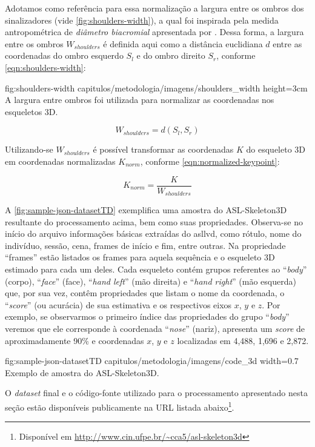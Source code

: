 \begin{enumerate}
          Adotamos como referência para essa normalização a largura entre os ombros dos sinalizadores (vide \autoref{fig:shoulders-width}), a qual foi inspirada pela medida antropométrica de \textit{diâmetro biacromial} apresentada por . Dessa forma, a largura entre os ombros \(W_{shoulders}\) é definida aqui como a distância euclidiana \(d\) entre as coordenadas do ombro esquerdo \(S_{l}\) e do ombro direito \(S_ {r}\), conforme \autoref{eqn:shoulders-width}:

          \figura
          {fig:shoulders-width} %
          {capitulos/metodologia/imagens/shoulders_width} %
          {height=3cm} %
          {A largura entre ombros foi utilizada para normalizar as coordenadas nos esqueletos 3D.} %
          {} %

          \begin{equation}
              \label{eqn:shoulders-width}
              W_{shoulders} = d\left(S_{l}, S_{r}\right)
          \end{equation}

          Utilizando-se \(W_{shoulders}\) é possível transformar as coordenadas \(K\) do esqueleto 3D em coordenadas normalizadas \(K_{norm}\), conforme \autoref{eqn:normalized-keypoint}:

          \begin{equation}
              \label{eqn:normalized-keypoint}
              K_{norm} = \frac{K}{W_{shoulders}}
          \end{equation}

\end{enumerate}


A \autoref{fig:sample-json-datasetTD} exemplifica uma amostra do ASL-Skeleton3D resultante do processamento acima, bem como suas propriedades. Observa-se no início do arquivo informações básicas extraídas do \acrshort{asllvd}, como rótulo, nome do indivíduo, sessão, cena, frames de início e fim, entre outras. Na propriedade ``frames'' estão listados os frames para aquela sequência e o esqueleto 3D estimado para cada um deles. Cada esqueleto contém grupos referentes ao ``\textit{body}'' (corpo), ``\textit{face}'' (face), ``\textit{hand left}'' (mão direita) e ``\textit{hand right}'' (mão esquerda) que, por sua vez, contêm propriedades que listam o nome da coordenada, o ``\textit{score}'' (ou acurácia) de sua estimativa e os respectivos eixos \(x\), \(y\) e \(z\).
Por exemplo, se observarmos o primeiro índice das propriedades do grupo ``\textit{body}'' veremos que ele corresponde à coordenada ``\textit{nose}'' (nariz), apresenta um \textit{score} de aproximadamente 90\% e coordenadas \(x\), \(y\) e \(z\) localizadas em 4,488, 1,696 e 2,872.

\figura
{fig:sample-json-datasetTD} %
{capitulos/metodologia/imagens/code_3d} %
{width=0.7\linewidth} %
{Exemplo de amostra do ASL-Skeleton3D.} %
{} %

O \textit{dataset} final e o código-fonte utilizado para o processamento apresentado nesta seção estão disponíveis publicamente na URL listada abaixo\footnote{Disponível em \url{http://www.cin.ufpe.br/~cca5/asl-skeleton3d}}.
